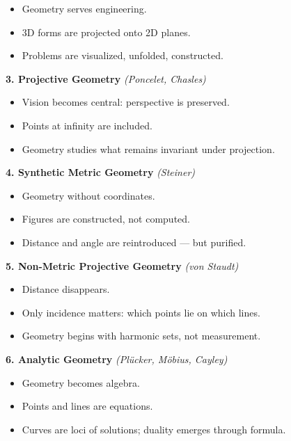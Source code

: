 \documentclass[9pt]{article}
\begin{document}
\begin{itemize}
  \item Geometry serves engineering.
  \item 3D forms are projected onto 2D planes.
  \item Problems are visualized, unfolded, constructed.
\end{itemize}

\bigskip

\textbf{3. Projective Geometry} \hfill \textit{(Poncelet, Chasles)}

\begin{itemize}
  \item Vision becomes central: perspective is preserved.
  \item Points at infinity are included.
  \item Geometry studies what remains invariant under projection.
\end{itemize}

\bigskip

\textbf{4. Synthetic Metric Geometry} \hfill \textit{(Steiner)}

\begin{itemize}
  \item Geometry without coordinates.
  \item Figures are constructed, not computed.
  \item Distance and angle are reintroduced — but purified.
\end{itemize}

\bigskip

\textbf{5. Non-Metric Projective Geometry} \hfill \textit{(von Staudt)}

\begin{itemize}
  \item Distance disappears.
  \item Only incidence matters: which points lie on which lines.
  \item Geometry begins with harmonic sets, not measurement.
\end{itemize}

\bigskip

\textbf{6. Analytic Geometry} \hfill \textit{(Plücker, Möbius, Cayley)}

\begin{itemize}
  \item Geometry becomes algebra.
  \item Points and lines are equations.
  \item Curves are loci of solutions; duality emerges through formula.
\end{itemize}
\end{document}
